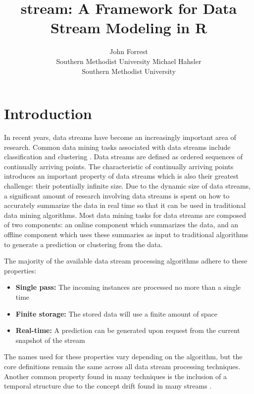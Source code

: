 \documentclass[nojss]{jss}
\author{John Forrest\\Southern Methodist University \And
    Michael Hahsler\\Southern Methodist University}
\title{stream: A Framework for Data Stream Modeling in R}
\begin{document}

\clearpage
\tableofcontents
\clearpage

\section{Introduction}

In recent years, data streams have become an increasingly important area of research. Common data mining tasks associated with data streams include classification and clustering \citep{stream:Aggarwal:2009}. Data streams are defined as ordered sequences of continually arriving points. The characteristic of continually arriving points introduces an important property of data streams which is also their greatest challenge: their potentially infinite size. Due to the dynamic size of data streams, a significant amount of research involving data streams is spent on how to accurately summarize the data in real time so that it can be used in traditional data mining algorithms. Most data mining tasks for data streams are composed of two components: an online component which summarizes the data, and an offline component which uses these summaries as input to traditional algorithms to generate a prediction or clustering from the data.


The majority of the available data stream processing algorithms adhere to these properties:

\begin{itemize}
	\item \textbf{Single pass:} The incoming instances are processed no more than a single time
	\item \textbf{Finite storage:} The stored data will use a finite amount of space
	\item \textbf{Real-time:} A prediction can be generated upon request from the current snapshot of the stream
\end{itemize}


The names used for these properties vary depending on the algorithm, but the core definitions remain the same across all data stream processing techniques. Another common property found in many techniques is the inclusion of a temporal structure due to the concept drift found in many streams \citep{stream:Masud+Chen+Khan+Aggarwal+Gao+Han+Thuraisingham:2010}.
\end{document}
